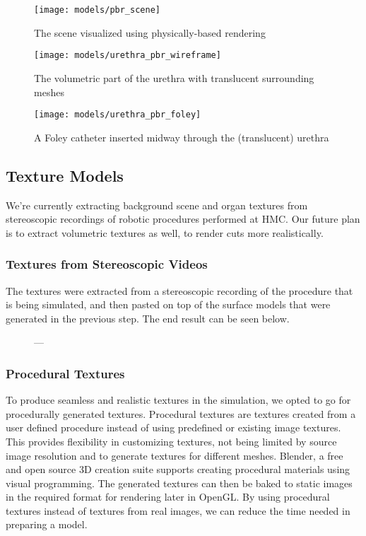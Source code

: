 \begin{figure}
  \centering
  \texttt{[image: models/pbr\_scene]}
  \caption{The scene visualized using physically-based rendering}
  \label{fig:pbr_scene}
\end{figure}

\begin{figure}
  \centering
  \texttt{[image: models/urethra\_pbr\_wireframe]}
  \caption{The volumetric part of the urethra with translucent surrounding meshes}
  \label{fig:urethra_pbr_wireframe}
\end{figure}

\begin{figure}
  \centering
  \texttt{[image: models/urethra\_pbr\_foley]}
  \caption{A Foley catheter inserted midway through the (translucent) urethra}
  \label{fig:urethra_pbr_foley}
\end{figure}

\subsection{Texture Models}
We're currently extracting background scene and organ textures from stereoscopic recordings of robotic procedures performed at HMC. Our future plan is to extract volumetric textures as well, to render cuts more realistically.


\subsubsection{Textures from Stereoscopic Videos}\label{sssec:videos}
The textures were extracted from a stereoscopic recording of the procedure that is being simulated, and then pasted on top of the surface models that were generated in the previous step. The end result can be seen below.

\begin{figure}
  \centering%
  \setlength{\fboxsep}{0pt}%
  \setlength{\fboxrule}{0.1pt}%
  \hfill%
  \caption{---}\label{fig:texture_videos}
\end{figure}

\subsubsection{Procedural Textures}\label{sssec:procedural}
To produce seamless and realistic textures in the simulation, we opted to go for procedurally generated textures. Procedural textures are textures created from a user defined procedure instead of using predefined or existing image textures. This provides flexibility in customizing textures, not being limited by source image resolution and to generate textures for different meshes. Blender, a free and open source 3D creation suite supports creating procedural materials using visual programming. The generated textures can then be baked to static images in the required format for rendering later in OpenGL. By using procedural textures instead of textures from real images, we can reduce the time needed in preparing a model.

